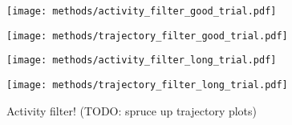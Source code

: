 \documentclass[../main.tex]{subfiles}
\begin{document}
\begin{figure}[H]%
  \begin{minipage}[b]{0.7\linewidth}
    \centering
    \texttt{[image: methods/activity\_filter\_good\_trial.pdf]}
    \subcaption{}
    \vspace{4ex}
  \end{minipage}%
  \begin{minipage}[b]{0.3\linewidth}
    \centering
    \texttt{[image: methods/trajectory\_filter\_good\_trial.pdf]}
    \subcaption{}
    \vspace{4ex}
  \end{minipage}
  \begin{minipage}[b]{0.7\linewidth}
    \centering
    \texttt{[image: methods/activity\_filter\_long\_trial.pdf]}
    \subcaption{}
    \vspace{4ex}
  \end{minipage}%
  \begin{minipage}[b]{0.3\linewidth}
    \centering
    \texttt{[image: methods/trajectory\_filter\_long\_trial.pdf]}
    \subcaption{}
    \vspace{4ex}
  \end{minipage}
  \caption[Activity filter for EMG and trajectories]{Activity filter! (TODO: spruce up trajectory plots)}\label{fig:activity_filter}
\end{figure}






\end{document}
